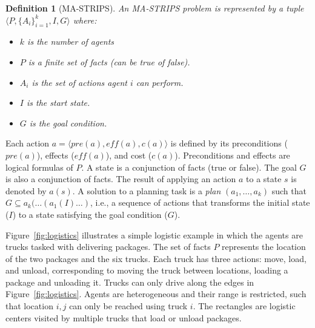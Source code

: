\documentclass[letterpaper]{article}
\newcommand{\eff}{\textit{eff}}
\newcommand{\pre}{\textit{pre}}
\newtheorem{definition}{Definition}
\theoremstyle{definition}
\begin{document}
\begin{definition}[MA-STRIPS]
An MA-STRIPS problem is represented by a tuple $\langle P, \{A_i\}_{i=1}^k, I ,G \rangle$ where:
\begin{itemize}
	\item $k$ is the number of agents
	\item $P$ is a finite set of facts (can be true of false). 
    \item $A_i$ is the set of actions agent $i$ can perform. 
	\item $I$ is the start state.
	\item $G$ is the goal condition.	
\end{itemize} 
\label{def:ma-strips}
\end{definition}
Each action $a=\langle \pre(a), \eff(a), c(a) \rangle$ is defined by its preconditions ($\pre(a)$), effects ($\eff(a)$), and cost ($c(a)$). Preconditions and effects are logical formulas of $P$. A state is a conjunction of facts (true or false). The goal $G$ is also a conjunction of facts. The result of applying an action $a$ to a state $s$ is denoted by $a(s)$. A solution to a planning task is a {\em plan} $(a_1,\ldots,a_k)$ such that $G\subseteq a_k(\ldots(a_1(I)\ldots)$, i.e., a sequence of actions that transforms the initial state ($I$) to a state satisfying the goal condition ($G$). 



Figure~\ref{fig:logistics} illustrates a simple logistic example in which the agents are trucks tasked with delivering packages. %
The set of facts $P$ represents the location of the two packages and the six trucks. Each truck has three actions: move, load, and unload, corresponding to moving the truck between locations, loading a package and unloading it. Trucks can only drive along the edges in Figure~\ref{fig:logistics}. Agents are heterogeneous  and their range is restricted, such that location $i,j$ can only be reached using truck $i$. The rectangles are logistic centers visited by multiple trucks that load or unload packages. 
\end{document}
